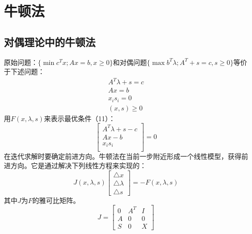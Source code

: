\documentclass[a4paper,12pt]{article}
\begin{document}
\section{牛顿法}
\subsection{对偶理论中的牛顿法}
原始问题：$\{\min  c^{T}x;Ax=b, x\ge 0\}$和对偶问题$\{\max b^{T}\lambda;A^{T}+s=c, s\ge 0\}$等价于下述问题：
\begin{equation}
\begin{array}{c}
A^{T}\lambda+s=c\\
Ax=b\\
x_is_i=0\\
(x,s)\ge 0
\end{array}
\end{equation}
用$F(x,\lambda,s)$来表示最优条件（11）：
\begin{equation}
\left[
\begin{array}{c}
A^{T}\lambda+s-c\\
Ax-b\\
x_is_i\\
\end{array}
\right]
=0
\end{equation}
在迭代求解时要确定前进方向。牛顿法在当前一步附近形成一个线性模型，获得前进方向。它是通过解决下列线性方程来实现的：
\begin{equation}
J(x,\lambda,s)
\left[
\begin{array}{c}
\bigtriangleup x\\
\bigtriangleup \lambda\\
\bigtriangleup s
\end{array}
\right]
=
-F(x,\lambda,s)
\end{equation}
其中$J$为$F$的雅可比矩阵。
\begin{equation}
J=
\left[
\begin{array}{ccc}
0 & A^T & I\\
A & 0 & 0\\
S & 0 & X
\end{array}
\right]
\end{equation}
\end{document}
